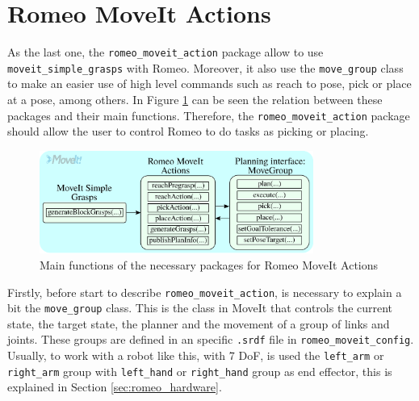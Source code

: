 \documentclass[12pt,a4paper,final,twoside,openright]{report}
\begin{document}
\section{Romeo MoveIt Actions}
\label{sec:romeo_moveit_actions}


As the last one, the \texttt{romeo\_moveit\_action} package allow to use \texttt{moveit\_simple\_grasps} with Romeo. Moreover, it also use the \texttt{move\_group} class to make an easier use of high level commands such as reach to pose, pick or place at a pose, among others. In Figure \ref{fig:moveit_internal} can be seen the relation between these packages and their main functions. Therefore, the \texttt{romeo\_moveit\_action} package should allow the user to control Romeo to do tasks as picking or placing.

\begin{figure}[h]
\centering
\includegraphics[width=0.8\textwidth]{images/moveit_internal.eps}
\caption{Main functions of the necessary packages for Romeo MoveIt Actions\label{fig:moveit_internal}}
\end{figure}

Firstly, before start to describe \texttt{romeo\_moveit\_action}, is necessary to explain a bit the \texttt{move\_group} class. This is the class in MoveIt that controls the current state, the target state, the planner and the movement of a group of links and joints. These groups are defined in an specific \texttt{.srdf} file in \texttt{romeo\_moveit\_config}. Usually, to work with a robot like this, with 7 DoF, is used the \texttt{left\_arm} or \texttt{right\_arm} group with \texttt{left\_hand} or \texttt{right\_hand} group as end effector, this is explained in Section \ref{sec:romeo_hardware}.
\end{document}
